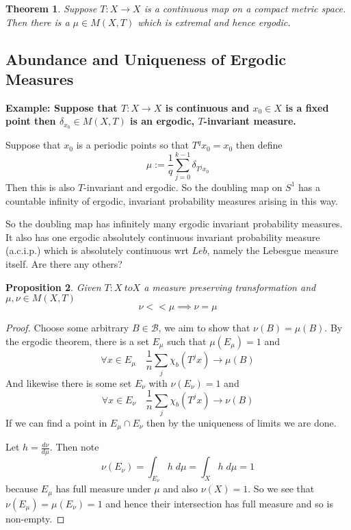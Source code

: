 \documentclass[11pt]{article}
\newcommand{\defeq}{:=}
\newenvironment{eg}
	{\begin{mdframed}[backgroundcolor=mylg,roundcorner=5pt,linewidth=0pt]\bfseries{Example:}\normalfont}
	{\end{mdframed}}
\newtheorem{prop}{Proposition}[section]
\newtheorem{theorem}[prop]{Theorem}
\begin{document}
\begin{theorem}
Suppose $T: X \to X$ is a continuous map on a compact metric space.
Then there is a $\mu\in M(X, T)$ which is extremal and hence ergodic.
\end{theorem}

\subsection{Abundance and Uniqueness of Ergodic Measures}
\begin{eg}
	Suppose that $T:X \to X$ is continuous and $x_0\in X$ is a fixed point then $\delta_{x_0}\in M(X, T)$ is an ergodic, $T$-invariant measure.

	Suppose that $x_0$ is a periodic points so that $T^qx_0 = x_0$ then define
	\[
		\mu \defeq \frac{1}{q}\sum_{j=0}^{k-1}\delta_{T^jx_0}
	\]
	Then this is also $T$-invariant and ergodic.
	So the doubling map on $S^1$ has a countable infinity of ergodic, invariant probability measures arising in this way.
\end{eg}

So the doubling map has infinitely many ergodic invariant probability measures.
It also has one ergodic absolutely continuous invariant probability measure (a.c.i.p.) which is absolutely continuous wrt $Leb$, namely the Lebesgue measure itself.
Are there any others?

\begin{prop}
Given $T:X\ to X$ a measure preserving transformation and $\mu, \nu \in M(X, T)$
\[
\nu << \mu \implies \nu = \mu
\]
\end{prop}

\begin{proof}
Choose some arbitrary $B\in \mathcal{B}$, we aim to show that $\nu(B)=\mu(B)$.
By the ergodic theorem, there is a set $E_\mu$ such that $\mu(E_\mu)=1$ and
\[
	\forall x \in E_\mu \quad \frac{1}{n}\sum_{j}\chi_b(T^jx)\to \mu(B)
\]
And likewise there is some set $E_\nu$ with $\nu(E_\nu) = 1$ and
\[
	\forall x \in E_\nu \quad \frac{1}{n}\sum_{j}\chi_b(T^jx)\to \nu(B)
\]
If we can find a point in $E_\mu \cap E_\nu$ then by the uniqueness of limits we are done.

Let $h=\frac{d\nu}{d\mu}$.
Then note
\[
	\nu(E_\nu) = \int_{E_\nu}h\; d\mu = \int_X h \; d\mu = 1
\]
because $E_\mu$ has full measure under $\mu$ and also $\nu(X)=1$.
So we see that $\nu(E_\mu)=\mu(E_\nu)=1$ and hence their intersection has full measure and so is non-empty.
\end{proof}
\end{document}
